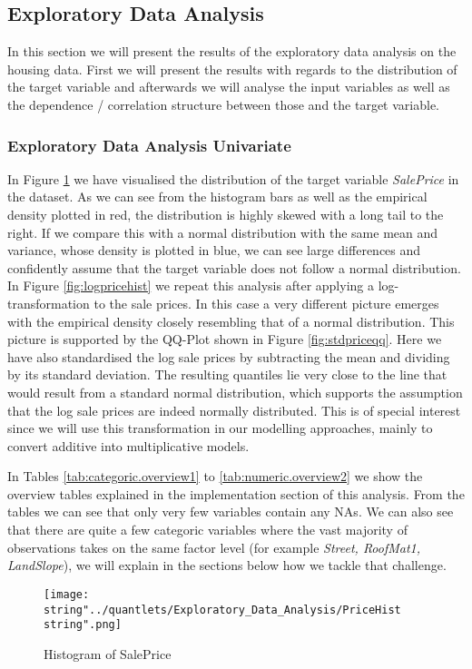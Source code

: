 \subsection{Exploratory Data Analysis}
In this section we will present the results of the exploratory data analysis on the housing data. First we will present the results with regards to the distribution of the target variable and afterwards we will analyse the input variables as well as the dependence / correlation structure between those and the target variable. 
\subsubsection{Exploratory Data Analysis Univariate}
In Figure \ref{fig:pricehist} we have visualised the distribution of the target variable \textit{SalePrice} in the dataset. As we can see from the histogram bars as well as the empirical density plotted in red, the distribution is highly skewed with a long tail to the right. If we compare this with a normal distribution with the same mean and variance, whose density is plotted in blue, we can see large differences and confidently assume that the target variable does not follow a normal distribution. 
In Figure \ref{fig:logpricehist} we repeat this analysis after applying a log-transformation to the sale prices. In this case a very different picture emerges with the empirical density closely resembling that of a normal distribution. This picture is supported by the QQ-Plot shown in Figure \ref{fig:stdpriceqq}. Here we have also standardised the log sale prices by subtracting the mean and dividing by its standard deviation. The resulting quantiles lie very close to the line that would result from a standard normal distribution, which supports the assumption that the log sale prices are indeed normally distributed. This is of special interest since we will use this transformation in our modelling approaches, mainly to convert additive into multiplicative models. 

In Tables \ref{tab:categoric.overview1} to \ref{tab:numeric.overview2} we show the overview tables explained in the implementation section of this analysis. From the tables we can see that only very few variables contain any NAs. We can also see that there are quite a few categoric variables where the vast majority of observations takes on the same factor level (for example \textit{Street, RoofMat1, LandSlope}), we will explain in the sections below how we tackle that challenge.

\begin{figure}[H]
  \centering
\texttt{[image: \\string"../quantlets/Exploratory\_Data\_Analysis/PriceHist\\string".png]}
  \caption{Histogram of SalePrice}\label{fig:pricehist}
\end{figure}

